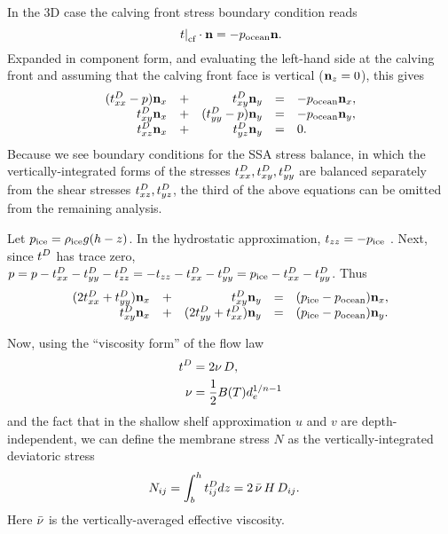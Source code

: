 \documentclass[11pt]{article}
\begin{document}
In the 3D case the calving front stress boundary condition \cite[equation (6.19)]{GreveBlatter2009} reads
\begin{equation*}
\left.t\right|_{\text{cf}} \cdot \mathbf{n} = -p_{\text{ocean}} \mathbf{n}.
\end{equation*}
Expanded in component form, and evaluating the left-hand side at
the calving front and assuming that the calving front face is vertical
($\mathbf{n}_{z} = 0$), this gives
\begin{equation*}
\begin{array}{rcrcl}
(t^{D}_{xx} - p) \mathbf{n}_{x} &+& t^{D}_{xy} \mathbf{n}_{y} &=& -p_{\text{ocean}} \mathbf{n}_{x},\\
t^{D}_{xy} \mathbf{n}_{x} &+& (t^{D}_{yy} - p) \mathbf{n}_{y} &=& -p_{\text{ocean}}  \mathbf{n}_{y},\\
t^{D}_{xz} \mathbf{n}_{x} &+& t^{D}_{yz} \mathbf{n}_{y} &=& 0.
\end{array}
\end{equation*}
Because we see boundary conditions for the SSA stress balance, in which the vertically-integrated forms of the stresses $t^{D}_{xx},t^{D}_{xy},t^{D}_{yy}$ are balanced separately from the shear stresses $t^{D}_{xz},t^{D}_{yz}$, the third of the above equations can be omitted from the remaining analysis.

Let $p_{\text{ice}}=\rho_{\text{ice}} g (h-z)$.  In the hydrostatic approximation, $t_{zz}=-p_{\text{ice}}$ \cite[equation (5.59)]{GreveBlatter2009}.  Next, since $t^{D}_{}$ has trace zero, $p = p - t^{D}_{xx} - t^{D}_{yy} - t^{D}_{zz} = - t_{zz} - t^{D}_{xx} - t^{D}_{yy} = p_{\text{ice}} - t^{D}_{xx} - t^{D}_{yy}$.  Thus
\begin{equation}
\label{eq:1}
\begin{array}{rcrcl}
(2t^{D}_{xx} + t^{D}_{yy}) \mathbf{n}_{x} &+& t^{D}_{xy} \mathbf{n}_{y} &=& (p_{\text{ice}} - p_{\text{ocean}}) \mathbf{n}_{x},\\
t^{D}_{xy} \mathbf{n}_{x} &+& (2t^{D}_{yy} + t^{D}_{xx}) \mathbf{n}_{y} &=& (p_{\text{ice}} - p_{\text{ocean}}) \mathbf{n}_{y}.\\
\end{array}
\end{equation}

Now, using the ``viscosity form'' of the flow law
\begin{align*}
t^{D}_{} &= 2\nu\, D,\\
\nu &= \frac 12 B(T) d_{e}^{1/n-1}
\end{align*}
and the fact that in the shallow shelf approximation $u$ and $v$ are
depth-independent, we can define the membrane stress $N$ as the
vertically-integrated deviatoric stress
\begin{align*}
N_{ij} &= \int_{b}^{h} t^{D}_{ij} dz = 2\, \bar {\nu}\, H\, D_{ij}.\notag
\end{align*}
Here $\bar {\nu}$ is the vertically-averaged effective viscosity.
\end{document}
